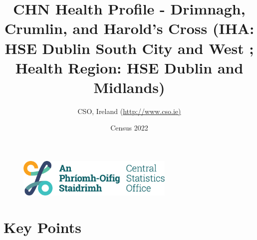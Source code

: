 \documentclass{article}
\title{CHN Health Profile - Drimnagh, Crumlin, and Harold's Cross (IHA: HSE Dublin South City and West ;  Health Region: HSE Dublin and Midlands) }
\date{Census 2022}
\author{CSO, Ireland  (\url{http://www.cso.ie)}}
\begin{document}


\begin{figure}
	\centering
\includegraphics[width =75mm]{../figures/CSO_Logo.png}
\end{figure}

				 
		   
						  
														  
																																													
												 
			 
\maketitle
					
													   
				 
						 
																																																																											   
				 
				  
  \pagebreak
    	    \tableofcontents

\pagebreak


\section{Key Points}
\end{document}
